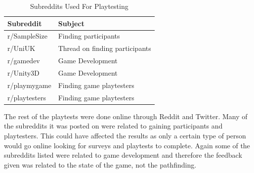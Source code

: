 \documentclass[journal]{IEEEtran}
\begin{document}
	\begin{table}[H]
		\centering
		\caption{Subreddits Used For Playtesting}
		\label{table:Subreddits}
		\def\arraystretch{1.5}
		\begin{tabular}{ |l|l|}
			\hline
			\textbf{Subreddit}    & \textbf{Subject} \\     \hline
			r/SampleSize        & Finding participants  \\ \hline
			r/UniUK             & Thread on finding participants \\ \hline
			r/gamedev             & Game Development \\ \hline
			r/Unity3D             & Game Development \\ \hline
			r/playmygame         & Finding game playtesters \\ \hline
			r/playtesters         & Finding game playtesters \\ \hline
		\end{tabular}
	\end{table}
	
	The rest of the playtests were done online through Reddit and Twitter. Many of the subreddits it was posted on were related to gaining participants and playtesters. This could have affected the results as only a certain type of person would go online looking for surveys and playtests to complete. Again some of the subreddits listed were related to game development and therefore the feedback given was related to the state of the game, not the pathfinding.     
	
	
\end{document}
